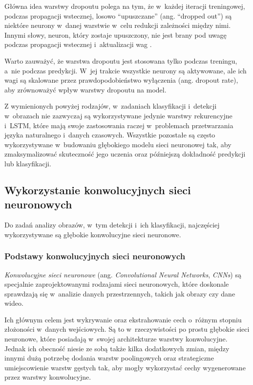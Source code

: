 \begin{itemize}
        Główna idea warstwy dropoutu polega na tym, że w~każdej iteracji treningowej, podczas propagacji wstecznej, losowo ``upuszczane'' (ang. ``dropped out'') są niektóre neurony w~danej warstwie w~celu redukcji zależności między nimi.
        Innymi słowy, neuron, który zostaje upuszczony, nie jest brany pod uwagę podczas propagacji wstecznej i~aktualizacji wag \cite{srivastava2014dropout}.

        Warto zauważyć, że warstwa dropoutu jest stosowana tylko podczas treningu, a~nie podczas predykcji.
        W~jej trakcie wszystkie neurony są aktywowane, ale ich wagi są skalowane przez prawdopodobieństwo wyłączenia (ang. dropout rate), aby zrównoważyć wpływ warstwy dropoutu na model.

\end{itemize}

Z wymienionych powyżej rodzajów, w~zadaniach klasyfikacji i~detekcji w~obrazach nie zazwyczaj są wykorzystywane jedynie warstwy rekurencyjne i~LSTM, które mają swoje zastosowania raczej w~problemach przetwarzania języka naturalnego i~danych czasowych.
Wszystkie pozostałe są często wykorzystywane w~budowaniu głębokiego modelu sieci neuronowej tak, aby zmaksymalizować skuteczność jego uczenia oraz późniejszą dokładność predykcji lub klasyfikacji.

\subsection{Wykorzystanie konwolucyjnych sieci neuronowych}

Do zadań analizy obrazów, w~tym detekcji i~ich klasyfikacji, najczęściej wykorzystywane są głębokie konwolucyjne sieci neuronowe.

\subsubsection{Podstawy konwolucyjnych sieci neuronowych}

\emph{Konwolucyjne sieci neuronowe} (ang. \emph{Convolutional Neural Networks}, \emph{CNNs}) są specjalnie zaprojektowanymi rodzajami sieci neuronowych, które doskonale sprawdzają się w~analizie danych przestrzennych, takich jak obrazy czy dane wideo.

Ich głównym celem jest wykrywanie oraz ekstrahowanie cech o~różnym stopniu złożoności w~danych wejściowych.
Są to w~rzeczywistości po prostu głębokie sieci neuronowe, które posiadają w~swojej architekturze warstwy konwolucyjne.
Jednak ich obecność niesie ze sobą także kilka dodatkowych zmian, między innymi dużą potrzebę dodania warstw poolingowych oraz strategiczne umiejscowienie warstw gęstych tak, aby mogły wykorzystać cechy wygenerowane przez warstwy konwolucyjne.

